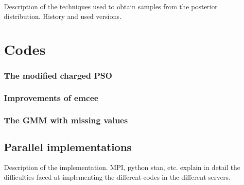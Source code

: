 Description of the techniques used to obtain samples from the posterior distribution.
History and used versions.

\section{Codes}
\label{sect:code}
\subsubsection{The modified charged PSO}
\subsubsection{Improvements of emcee}
\subsubsection{The GMM with missing values}
\subsection{Parallel implementations}
Description of the implementation. MPI, python stan, etc.
explain in detail the difficulties faced at implementing the different codes in the different servers.

